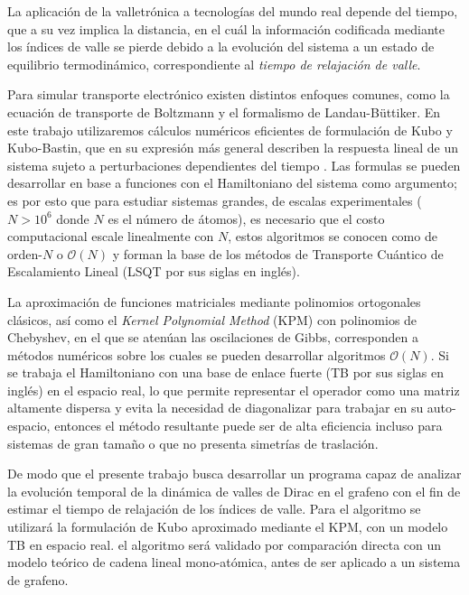 La aplicación de la valletrónica a tecnologías del mundo real depende del tiempo, que a su vez implica la distancia, en el cuál la información codificada mediante los índices de valle se pierde debido a la evolución del sistema a un estado de equilibrio termodinámico, correspondiente al \emph{tiempo de relajación de valle}.

Para simular transporte electrónico existen distintos enfoques comunes, como la ecuación de transporte de Boltzmann y el formalismo de Landau-Büttiker. 
En este trabajo utilizaremos cálculos numéricos eficientes de formulación de Kubo y Kubo-Bastin, que en su expresión más general describen la respuesta lineal de un sistema sujeto a perturbaciones dependientes del tiempo \autocite{Garcia2018a}. 
Las formulas se pueden desarrollar en base a funciones con el Hamiltoniano del sistema como argumento; es por esto que para estudiar sistemas grandes, de escalas experimentales ($ N > 10^6 $ donde $ N $ es el número de átomos), es necesario que el costo computacional escale linealmente con $ N $, estos algoritmos se conocen como de orden-$ N $ o $ \mathcal{O}(N) $ y forman la base de los métodos de Transporte Cuántico de Escalamiento Lineal (LSQT por sus siglas en inglés).

La aproximación de funciones matriciales mediante polinomios ortogonales clásicos, así como el \emph{Kernel Polynomial Method} (KPM) con polinomios de Chebyshev, en el que se atenúan las oscilaciones de Gibbs, corresponden a métodos numéricos sobre los cuales se pueden desarrollar algoritmos $ \mathcal O(N) $. 
Si se trabaja el Hamiltoniano con una base de enlace fuerte (TB por sus siglas en inglés) en el espacio real, lo que permite representar el operador como una matriz altamente dispersa y evita la necesidad de diagonalizar para trabajar en su auto-espacio, entonces el método resultante puede ser de alta eficiencia incluso para sistemas de gran tamaño o que no presenta simetrías de traslación.

De modo que el presente trabajo busca desarrollar un programa capaz de analizar la evolución temporal de la dinámica de valles de Dirac en el grafeno con el fin de estimar el tiempo de relajación de los índices de valle. Para el algoritmo se utilizará la formulación de Kubo aproximado mediante el KPM, con un modelo TB en espacio real. el algoritmo será validado por comparación directa con un modelo teórico de cadena lineal mono-atómica, antes de ser aplicado a un sistema de grafeno. 
